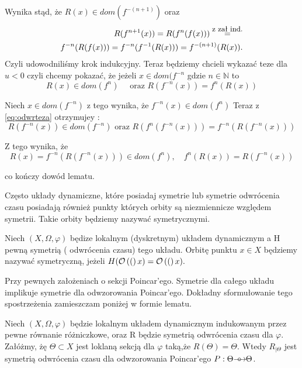       Wynika stąd, że $ R(x) \in dom(f^{-(n+1)}) $ oraz
     \begin{eqnarray*}
	  R(f^{n+1}(x))=R(f^n(f(x)))\stackrel{\mbox{\small z zał
	  ind.}}=\\f^{-n}(R(f(x)))=f^{-n}(f^{-1}(R(x)))=f^{-(n+1)}(R(x)).
      \end{eqnarray*}
    Czyli udowodniliśmy krok indukcyjny.
    Teraz będziemy chcieli wykazać teze dla $ u < 0 $ czyli chcemy pokazać,
    że jeżeli $ x \in  dom(f^{-n} $ gdzie $ n \in \mathbb N$ to 
	\begin{equation}
	  R(x) \in dom(f^n) \quad \mbox{ oraz } R(f^{-n}(x)) = f^{n}(R(x))
	\end{equation}
	
    Niech $ x \in dom(f^{-n}) $ z tego wynika, że $ f^{-n}(x) \in dom(f^n) $
    Teraz z \eqref{eq:odwrteza} otrzymujey :
    $$
      R(f^{-n}(x)) \in dom(f^{-n}) \mbox{ oraz } R(f^{n}(f^{-n}(x))) = f^{-n}(R(f^{-n}(x)))
    $$
    
    Z tego wynika, że
    $$
      R(x) = f^{-n}(R(f^{-n}(x))) \in dom(f^n), \quad f^n(R(x)) = R(f^{-n}(x))
    $$
    
    co kończy dowód lematu.
    
Często układy dynamiczne, które posiadaj symetrie lub symetrie odwrócenia czasu posiadają również punkty
których orbity są niezmiennicze względem symetrii. Takie orbity będziemy nazywać symetrycznymi. 

\begin{definition}
  Niech $(X,\Omega,\varphi) $ będize lokalnym (dyskretnym) układem dynamicznym a H pewną symetrią ( odwrócenia czasu) tego układu.
  Orbitę punktu $ x\in X $ będziemy nazywać symetryczną, jeżeli $ H(\mathcal O\left((\right)x) = \mathcal O\left((\right)x). $
  
\end{definition}

Przy pewnych założeniach o sekcji Poincar'ego. Symetrie dla całego układu implikuje symetrie dla odwzorowania Poincar'ego.
Dokładny sformułowanie tego spostrzeżenia zamieszczam poniżej w formie lematu.

\begin{lemma}
  \label{lem:poincareReverse}
  Niech $(X,\Omega,\varphi) $ będzie lokalnym układem dynamicznym indukowanym przez pewne równanie różniczkowe, oraz R będzie
  symetrią odwrócenia czasu dla $ \varphi $. Załóżmy, żę $ \Theta \subset X $ jest loklaną sekcją dla $\varphi$ taką,że
  $ R(\Theta) = \Theta$. Wtedy $R_{| \Theta} $ jest symetrią odwrócenia czasu dla odwzorowania Poincar'ego $ P: \Theta {\mathrel{\longrightarrow\mkern-25mu\circ}\;\;} \Theta$.
\end{lemma}

